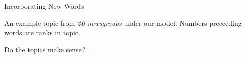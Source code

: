 \documentclass[compress]{beamer}
\begin{document}
\begin{frame}{Incorporating New Words}
\begin{center}
\vspace{-5mm}
An example topic from \textit{20 newsgroups} under our model.
Numbers preceeding words are ranks in topic.
\end{center}

\end{frame}


\begin{frame}{Do the topics make sense?}

\centering

\end{frame}
\end{document}
